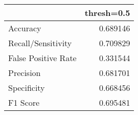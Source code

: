 \begin{tabu}{lr}
\toprule
 & thresh=0.5 \\
\midrule
Accuracy & 0.689146 \\
Recall/Sensitivity & 0.709829 \\
False Positive Rate & 0.331544 \\
Precision & 0.681701 \\
Specificity & 0.668456 \\
F1 Score & 0.695481 \\
\bottomrule
\end{tabu}